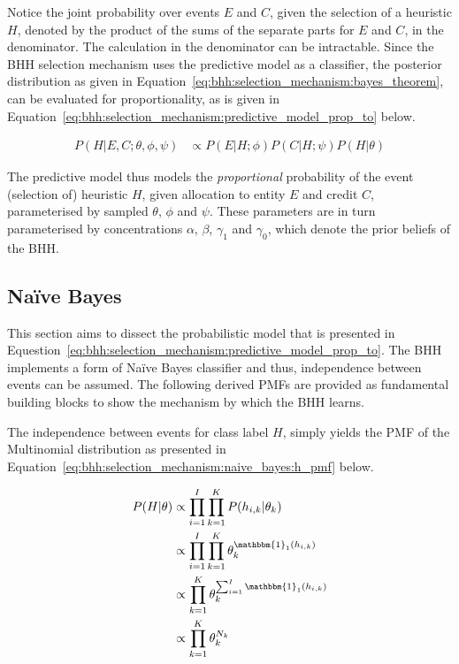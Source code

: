 Notice the joint probability over events $E$ and $C$, given the selection of a heuristic $H$, denoted by the product of the sums of the separate parts for $E$ and $C$, in the denominator. The calculation in the denominator can be intractable. Since the \acs{BHH} selection mechanism uses the predictive model as a classifier, the posterior distribution as given in Equation~\eqref{eq:bhh:selection_mechanism:bayes_theorem}, can be evaluated for proportionality, as is given in Equation~\eqref{eq:bhh:selection_mechanism:predictive_model_prop_to} below.

\begin{equation}
      \label{eq:bhh:selection_mechanism:predictive_model_prop_to}
      \begin{split}
            P(H \vert E, C;  \theta, \phi, \psi) &\propto P(E \vert H;  \phi)  P(C \vert H;  \psi) P(H \vert \theta)
      \end{split}
\end{equation}

The predictive model thus models the \textit{proportional} probability of the event (selection of) heuristic $H$, given allocation to entity $E$ and credit $C$, parameterised by sampled $\theta$, $\phi$ and $\psi$. These parameters are in turn parameterised by concentrations $\alpha$, $\beta$, $\gamma_{1}$ and $\gamma_{0}$, which denote the prior beliefs of the \acs{BHH}.


\subsection{Naïve Bayes}\label{sec:bhh:selection_mechanism:naive_bayes}

This section aims to dissect the probabilistic model that is presented in Equestion~\eqref{eq:bhh:selection_mechanism:predictive_model_prop_to}. The \acs{BHH} implements a form of Naïve Bayes classifier and thus, independence between events can be assumed. The following derived \acp{PMF} are provided as fundamental building blocks to show the mechanism by which the \acs{BHH} learns.

The independence between events for class label $H$, simply yields the \ac{PMF} of the Multinomial distribution as presented in Equation~\eqref{eq:bhh:selection_mechanism:naive_bayes:h_pmf} below.

\begin{equation}
      \label{eq:bhh:selection_mechanism:naive_bayes:h_pmf}
      \begin{split}
            P(H \vert \theta)
            &\propto \prod_{i=1}^{I} \prod_{k=1}^{K} P(h_{i,k} \vert \theta_{k}) \\
            &\propto \prod_{i=1}^{I} \prod_{k=1}^{K} \theta_{k}^{\mathbbm{1}_{1}(h_{i,k})} \\
            &\propto \prod_{k=1}^{K} \theta_{k}^{\sum_{i=1}^{I} \mathbbm{1}_{1}(h_{i,k})} \\
            &\propto \prod_{k=1}^{K} \theta_{k}^{N_{k}}
      \end{split}
\end{equation}

